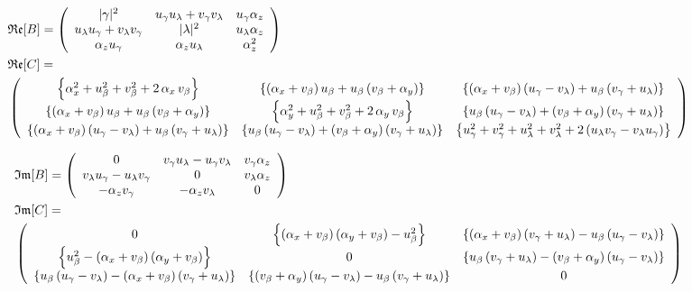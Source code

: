 \documentclass{article}
\begin{document}
\begin{align*}
    &\mathfrak{Re}[B]=\left( \begin{array}{ccc}
         |\gamma|^2& u_\gamma u_\lambda + v_\gamma v_\lambda & u_\gamma \alpha_z\\
         u_\lambda u_\gamma + v_\lambda v_\gamma & |\lambda|^2 & u_\lambda \alpha_z\\
         \alpha_z u_\gamma & \alpha_z u_\lambda & \alpha_z^2
    \end{array}  \right)\\
    &\mathfrak{Re}[C]=\\
    &\left( \begin{array}{c cc}
         \left\{\alpha_x^2+ u_\beta^2+v_\beta^2+2\,\alpha_x\,v_\beta\right\}&\left\{(\alpha_x + v_\beta)\,u_\beta + u_\beta\,(v_\beta+\alpha_y)\right\}& \left\{ (\alpha_x + v_\beta)\,( u_\gamma-v_\lambda) + u_\beta \,(v_\gamma+u_\lambda)   \right\}\\
        \left\{(\alpha_x + v_\beta)\,u_\beta + u_\beta\,(v_\beta+\alpha_y)\right\}&\left\{\alpha_y^2+u_\beta^2+v_\beta^2+2\,\alpha_y\,v_\beta\right\}& \left\{  u_\beta\, (u_\gamma-v_\lambda) + ( v_\beta+\alpha_y)\, (v_\gamma+u_\lambda) \right\}\\
         \left\{ (\alpha_x + v_\beta)\,( u_\gamma-v_\lambda) + u_\beta \,(v_\gamma+u_\lambda)   \right\} & \left\{  u_\beta\, (u_\gamma-v_\lambda) + ( v_\beta+\alpha_y)\, (v_\gamma+u_\lambda) \right\} & \left\{u_\gamma^2+v_\gamma^2+u_\lambda^2+v_\lambda^2+ 2\, (u_\lambda v_\gamma-v_\lambda u_\gamma) \right\}
    \end{array} \right)
\end{align*}


 \begin{align*}
    &\mathfrak{Im}[B]=\left( \begin{array}{ccc}
         0& v_\gamma u_\lambda - u_\gamma v_\lambda & v_\gamma \alpha_z\\
         v_\lambda u_\gamma - u_\lambda v_\gamma & 0 & v_\lambda \alpha_z\\
        - \alpha_z v_\gamma & -\alpha_z v_\lambda & 0
    \end{array}  \right)\\
    &\mathfrak{Im}[C]=\\
    &\left( \begin{array}{c cc}
        0&\left\{(\alpha_x + v_\beta)\,(\alpha_y + v_\beta) - u_\beta^2\right\}& \left\{ (\alpha_x + v_\beta)\,(v_\gamma+u_\lambda)-u_\beta\,( u_\gamma-v_\lambda)\right\}\\
        \left\{u_\beta^2- (\alpha_x + v_\beta)\,(\alpha_y + v_\beta)  \right\}& 0 & \left\{  u_\beta\, (v_\gamma+u_\lambda) - ( v_\beta+\alpha_y)\, (u_\gamma-v_\lambda) \right\}\\
        \left\{ u_\beta\,( u_\gamma-v_\lambda)-  (\alpha_x + v_\beta)\,(v_\gamma+u_\lambda)\right\} & \left\{( v_\beta+\alpha_y)\, (u_\gamma-v_\lambda) -  u_\beta\, (v_\gamma+u_\lambda)   \right\} & 0
    \end{array} \right)
\end{align*}
\end{document}
